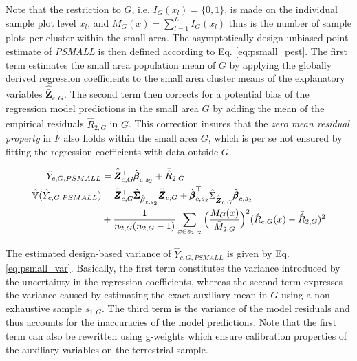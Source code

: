 Note that the restriction to $G$, i.e. $I_{G}(x_l)=\{0,1\}$, is made on the individual sample plot level $x_l$, and $M_{G}(x) = \sum_{l=1}^{L}I_{G}(x_l)$ thus is the number of sample plots per cluster within the small area. The asymptotically design-unbiased point estimate of \textit{PSMALL} is then defined according to Eq. \ref{eq:psmall_pest}. The first term estimates the small area population mean of $G$ by applying the globally derived regression coefficients to the small area cluster means of the explanatory variables $\hat{\bar{\pmb{Z}}}_{c,G}$. The second term then corrects for a potential bias of the regression model predictions in the small area $G$ by adding the mean of the empirical residuals $\bar{\hat{R}}_{2,G}$ in $G$. This correction insures that the \textit{zero mean residual property} in $F$ also holds within the small area $G$, which is per se not ensured by fitting the regression coefficients with data outside $G$.

\begin{subequations}\label{eq:psmall}
	\begin{align}
	\hat{Y}_{c,G,PSMALL} &= \hat{\bar{\pmb{Z}}}_{c,G}^{\top}\hat{\pmb{\beta}}_{c,s_2} + \bar{\hat{R}}_{2,G} \label{eq:psmall_pest} \\
	\hat{\mathbb{V}}(\hat{Y}_{c,G,PSMALL}) & = \hat{\bar{\pmb{Z}}}_{c,G}^{\top}\hat{\pmb{\Sigma}}_{\hat{\pmb{\beta}}_{c,s_2}}\hat{\bar{\pmb{Z}}}_{c,G}
	+ \hat{\pmb{\beta}}_{c,s_2}^{\top}\hat{\Sigma}_{\hat{\bar{\pmb{Z}}}_{c,G}}\hat{\pmb{\beta}}_{c,s_2} \nonumber \\
	& + \frac{1}{n_{2,G}(n_{2,G}-1)}\sum_{x \in s_{2,G}}\Big(\frac{M_{G}(x)}{\bar{M}_{2,G}}\Big)^2(\hat{R}_{c,G}(x) - \bar{\hat{R}}_{2,G})^2
	\label{eq:psmall_var}
	\end{align}
\end{subequations}

The estimated design-based variance of $ \hat{Y}_{c,G,PSMALL}$ is given by Eq. \ref{eq:psmall_var}. Basically, the first term constitutes the variance introduced by the uncertainty in the regression coefficients, whereas the second term expresses the variance caused by estimating the exact auxiliary mean in $G$ using a non-exhaustive sample $s_{1,G}$. The third term is the variance of the model residuals and thus accounts for the inaccuracies of the model predictions. Note that the first term can also be rewritten using g-weights \cite[pg.14]{mandallaz2016} which ensure calibration properties of the auxiliary variables on the terrestrial sample.\\ 

